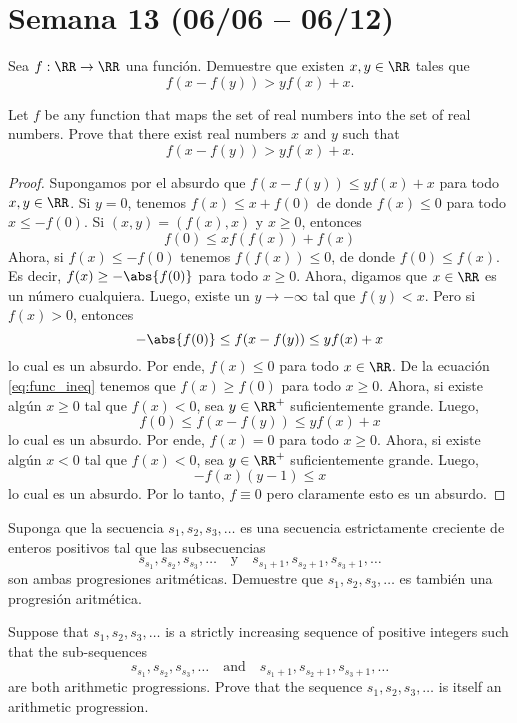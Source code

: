 \section{Semana 13 (06/06 -- 06/12)}


\begin{probMB}[ISL 2009/A5]
	Sea $f:\RR\to\RR$ una función. Demuestre que existen $x,y\in\RR$ tales que
	\[f(x-f(y))>yf(x)+x.\]
	\begin{hint}
		Let $f$ be any function that maps the set of real numbers into the set of real numbers. Prove that there exist real numbers $x$ and $y$ such that
		\[f(x-f(y))>yf(x)+x.\]
	\end{hint}
\end{probMB}

\begin{proof}
	Supongamos por el absurdo que $f(x-f(y))\le yf(x)+x$ para todo $x,y\in\RR$. Si $y=0$, tenemos $f(x)\le x+f(0)$ de donde $f(x)\le 0$ para todo $x\le -f(0)$. Si $(x,y)=(f(x),x)$ y $x\ge 0$, entonces
	\begin{equation}\label{eq:func_ineq}
		f(0)\le xf(f(x))+f(x)
	\end{equation}
	Ahora, si $f(x)\le -f(0)$ tenemos $f(f(x))\le 0$, de donde $f(0)\le f(x)$. Es decir, $f(x)\ge-\abs{f(0)}$ para todo $x\ge 0$. Ahora, digamos que $x\in\RR$ es un número cualquiera. Luego, existe un $y\to-\infty$ tal que $f(y)<x$. Pero si $f(x)>0$, entonces
	\[-\abs{f(0)}\le f(x-f(y))\le yf(x)+x\]
	lo cual es un absurdo. Por ende, $f(x)\le 0$ para todo $x\in\RR$. De la ecuación \eqref{eq:func_ineq} tenemos que $f(x)\ge f(0)$ para todo $x\ge 0$. Ahora, si existe algún $x\ge 0$ tal que $f(x)<0$, sea $y\in\RR^+$ suficientemente grande. Luego,
	\[f(0)\le f(x-f(y))\le yf(x)+x\]
	lo cual es un absurdo. Por ende, $f(x)=0$ para todo $x\ge 0$. Ahora, si existe algún $x<0$ tal que $f(x)<0$, sea $y\in\RR^+$ suficientemente grande. Luego,
	\[-f(x)(y-1)\le x\]
	lo cual es un absurdo. Por lo tanto, $f\equiv 0$ pero claramente esto es un absurdo.
\end{proof}

\begin{probMB}[ISL 2009/A6]
	Suponga que la secuencia $s_1,s_2,s_3,\dots$ es una secuencia estrictamente creciente de enteros positivos tal que las subsecuencias
	\[s_{s_1},s_{s_2},s_{s_3},\dots\quad\text{y}\quad s_{s_1+1},s_{s_2+1},s_{s_3+1},\dots\]
	son ambas progresiones aritméticas. Demuestre que $s_1,s_2,s_3,\dots$ es también una progresión aritmética.
	\begin{hint}
		Suppose that $s_1,s_2,s_3,\dots$ is a strictly increasing sequence of positive integers such that the sub-sequences
		\[s_{s_1},s_{s_2},s_{s_3},\dots\quad\text{and}\quad s_{s_1+1},s_{s_2+1},s_{s_3+1},\dots\]
		are both arithmetic progressions. Prove that the sequence $s_1,s_2,s_3,\dots$ is itself an arithmetic progression.
	\end{hint}
\end{probMB}

